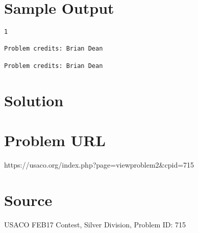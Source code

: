 \documentclass[12pt]{article}
\begin{document}
\section*{Sample Output}
\begin{verbatim}
1

Problem credits: Brian Dean

Problem credits: Brian Dean
\end{verbatim}

\section*{Solution}


\section*{Problem URL}
https://usaco.org/index.php?page=viewproblem2&cpid=715

\section*{Source}
USACO FEB17 Contest, Silver Division, Problem ID: 715
\end{document}
